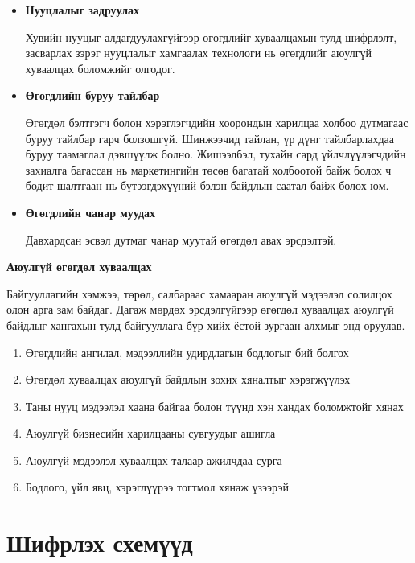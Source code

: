 \begin{itemize}
    \item \textbf{Нууцлалыг задруулах}

    Хувийн нууцыг алдагдуулахгүйгээр өгөгдлийг хуваалцахын тулд шифрлэлт, засварлах зэрэг нууцлалыг хамгаалах технологи нь өгөгдлийг аюулгүй хуваалцах боломжийг олгодог.
    \item \textbf{Өгөгдлийн буруу тайлбар}
    
    Өгөгдөл бэлтгэгч болон хэрэглэгчдийн хоорондын харилцаа холбоо дутмагаас буруу тайлбар гарч болзошгүй. Шинжээчид тайлан, үр дүнг тайлбарлахдаа буруу таамаглал дэвшүүлж болно. Жишээлбэл, тухайн сард үйлчлүүлэгчдийн захиалга багассан нь маркетингийн төсөв багатай холбоотой байж болох ч бодит шалтгаан нь бүтээгдэхүүний бэлэн байдлын саатал байж болох юм.
    \item \textbf{Өгөгдлийн чанар муудах}
    
    Давхардсан эсвэл дутмаг чанар муутай өгөгдөл авах эрсдэлтэй.
\end{itemize}

\textbf{Аюулгүй өгөгдөл хуваалцах}

Байгууллагийн хэмжээ, төрөл, салбараас хамааран аюулгүй мэдээлэл солилцох олон арга зам байдаг. Дагаж мөрдөх эрсдэлгүйгээр өгөгдөл хуваалцах аюулгүй байдлыг хангахын тулд байгууллага бүр хийх ёстой зургаан алхмыг энд оруулав.

\begin{enumerate}
    \item Өгөгдлийн ангилал, мэдээллийн удирдлагын бодлогыг бий болгох
    \item Өгөгдөл хуваалцах аюулгүй байдлын зохих хяналтыг хэрэгжүүлэх
    \item Таны нууц мэдээлэл хаана байгаа болон түүнд хэн хандах боломжтойг хянах
    \item Аюулгүй бизнесийн харилцааны сувгуудыг ашигла
    \item Аюулгүй мэдээлэл хуваалцах талаар ажилчдаа сурга
    \item Бодлого, үйл явц, хэрэглүүрээ тогтмол хянаж үзээрэй
\end{enumerate}


\section{Шифрлэх схемүүд}

